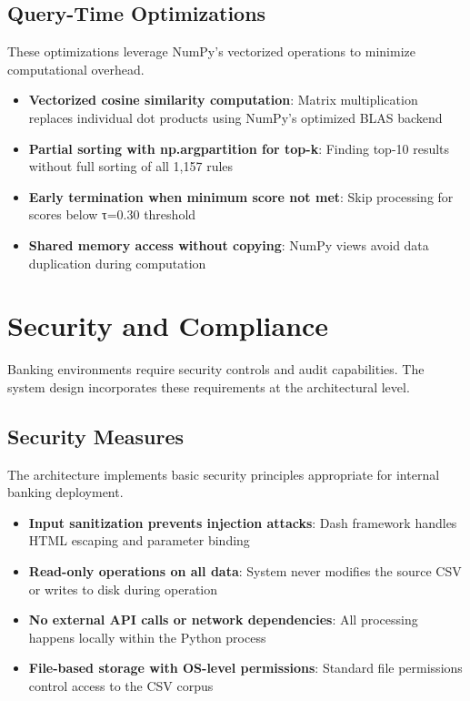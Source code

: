 \subsection{Query-Time Optimizations}

These optimizations leverage NumPy's vectorized operations to minimize computational overhead.

\begin{itemize}[leftmargin=*,itemsep=3pt,topsep=3pt]
  \item \textbf{Vectorized cosine similarity computation}: Matrix multiplication replaces individual dot products using NumPy's optimized BLAS backend
  \item \textbf{Partial sorting with np.argpartition for top-k}: Finding top-10 results without full sorting of all 1,157 rules
  \item \textbf{Early termination when minimum score not met}: Skip processing for scores below τ=0.30 threshold
  \item \textbf{Shared memory access without copying}: NumPy views avoid data duplication during computation
\end{itemize}

\newpage
\section{Security and Compliance}

Banking environments require security controls and audit capabilities. The system design incorporates these requirements at the architectural level.

\subsection{Security Measures}

The architecture implements basic security principles appropriate for internal banking deployment.

\begin{itemize}[leftmargin=*,itemsep=3pt,topsep=3pt]
  \item \textbf{Input sanitization prevents injection attacks}: Dash framework handles HTML escaping and parameter binding
  \item \textbf{Read-only operations on all data}: System never modifies the source CSV or writes to disk during operation
  \item \textbf{No external API calls or network dependencies}: All processing happens locally within the Python process
  \item \textbf{File-based storage with OS-level permissions}: Standard file permissions control access to the CSV corpus
\end{itemize}

